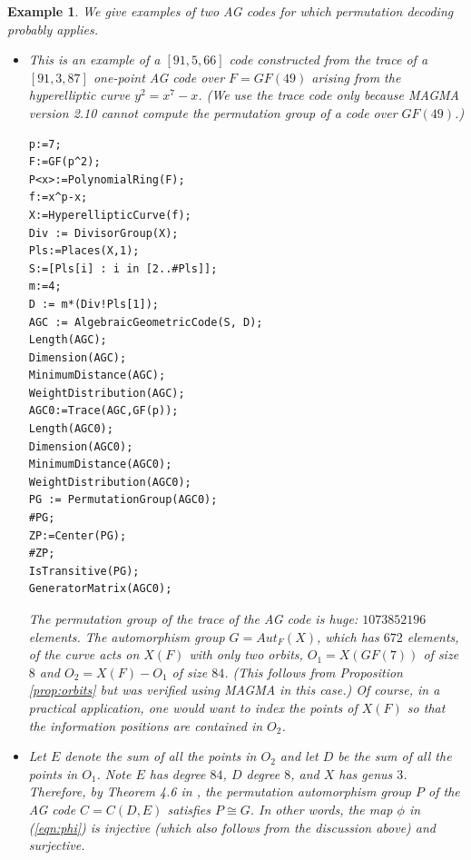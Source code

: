 \documentclass[12pt]{article}
\newtheorem{example}[theorem]{Example}
\numberwithin{equation}{section}
\begin{document}
\begin{example}
We give examples of two AG codes 
for which permutation decoding probably applies.

\begin{itemize}
\item
This is an example of a $[91,5,66]$ code constructed from 
the trace of a $[91,3,87]$ one-point AG
code over $F=GF(49)$ arising from the hyperelliptic curve
$y^2=x^7-x$. (We use the trace code only because MAGMA
version 2.10 cannot compute the permutation group of a
code over $GF(49)$.)  

{\small{
\begin{verbatim}
p:=7;
F:=GF(p^2);
P<x>:=PolynomialRing(F);
f:=x^p-x;
X:=HyperellipticCurve(f);
Div := DivisorGroup(X);
Pls:=Places(X,1);
S:=[Pls[i] : i in [2..#Pls]];
m:=4;
D := m*(Div!Pls[1]);
AGC := AlgebraicGeometricCode(S, D);
Length(AGC);
Dimension(AGC);
MinimumDistance(AGC);
WeightDistribution(AGC);
AGC0:=Trace(AGC,GF(p));
Length(AGC0);
Dimension(AGC0);
MinimumDistance(AGC0);
WeightDistribution(AGC0);
PG := PermutationGroup(AGC0);
#PG; 
ZP:=Center(PG);
#ZP; 
IsTransitive(PG);
GeneratorMatrix(AGC0);
\end{verbatim}
}}
The permutation group of the trace of the AG code is 
huge: $1073852196$ elements. The 
automorphism group $G=Aut_F(X)$, which has $672$ elements, 
of the curve acts on $X(F)$ with only two orbits,
$O_1=X(GF(7))$ of size $8$ and $O_2=X(F)-O_1$ of
size $84$. (This follows from Proposition \ref{prop:orbits}
but was verified using MAGMA in this case.)
Of course, in a practical application,
one would want to index the points of
$X(F)$ so that the information positions are contained in 
$O_2$.

\item
Let $E$ denote the sum of all the points in $O_2$
and let $D$ be the sum of all the points in $O_1$.
Note $E$ has degree $84$, $D$ degree $8$, and $X$ has genus $3$.
Therefore, by Theorem 4.6 in \cite{W},
the permutation automorphism group $P$ of the AG code $C=C(D,E)$  
satisfies $P\cong G$. In other words, the map
$\phi$ in (\ref{eqn:phi}) is injective (which also
follows from the discussion above) and surjective.
\end{itemize}
\end{example}
\end{document}
